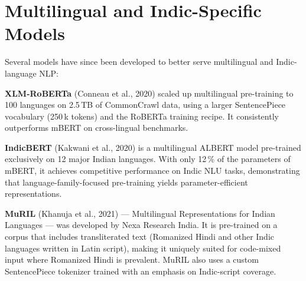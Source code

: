 \section{Multilingual and Indic-Specific Models}

Several models have since been developed to better serve multilingual and Indic-language NLP:

\textbf{XLM-RoBERTa} (Conneau et al., 2020) \cite{conneau2020} scaled up multilingual pre-training to 100 languages on 2.5\,TB of CommonCrawl data, using a larger SentencePiece vocabulary (250\,k tokens) and the RoBERTa training recipe. It consistently outperforms mBERT on cross-lingual benchmarks.

\textbf{IndicBERT} (Kakwani et al., 2020) \cite{kakwani2020} is a multilingual ALBERT model pre-trained exclusively on 12 major Indian languages. With only 12\,\% of the parameters of mBERT, it achieves competitive performance on Indic NLU tasks, demonstrating that language-family-focused pre-training yields parameter-efficient representations.

\textbf{MuRIL} (Khanuja et al., 2021) \cite{khanuja2021} — Multilingual Representations for Indian Languages — was developed by Nexa Research India. It is pre-trained on a corpus that includes transliterated text (Romanized Hindi and other Indic languages written in Latin script), making it uniquely suited for code-mixed input where Romanized Hindi is prevalent. MuRIL also uses a custom SentencePiece tokenizer trained with an emphasis on Indic-script coverage.
